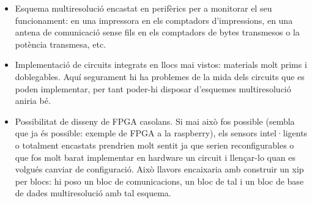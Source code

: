 \begin{itemize}
\begin{itemize}
  \item Esquema multiresolució encastat en perifèrics per a monitorar
    el seu funcionament: en una impressora en els comptadors
    d'impressions, en una antena de comunicació sense fils en els
    comptadors de bytes transmesos o la potència transmesa, etc.

  \item Implementació de circuits integrats en llocs mai vistos:
    materials molt prims i doblegables. Aquí segurament hi ha
    problemes de la mida dels circuits que es poden implementar, per
    tant poder-hi disposar d'esquemes multiresolució aniria bé.

  \item Possibilitat de disseny de FPGA casolans. Si mai això fos
    possible (sembla que ja és possible: exemple de FPGA a la
    raspberry), els sensors intel·ligents o totalment encastats
    prendrien molt sentit ja que serien reconfigurables o que fos molt
    barat implementar en hardware un circuit i llençar-lo quan es
    volgués canviar de configuració. Això llavors encaixaria amb
    construir un xip per blocs: hi poso un bloc de comunicacions, un
    bloc de tal i un bloc de base de dades multiresolució amb tal
    esquema.

  \end{itemize}


\end{itemize}







